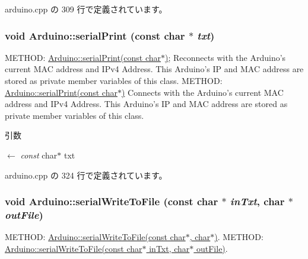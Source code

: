  arduino.cpp の 309 行で定義されています。\hypertarget{classArduino_a69177b866c5c37541d7e860c4e9ae3d7_a69177b866c5c37541d7e860c4e9ae3d7}{
\subsubsection[{serialPrint}]{\setlength{\rightskip}{0pt plus 5cm}void Arduino::serialPrint (const char $\ast$ {\em txt})}}
\label{classArduino_a69177b866c5c37541d7e860c4e9ae3d7_a69177b866c5c37541d7e860c4e9ae3d7}


METHOD: \hyperlink{classArduino_a69177b866c5c37541d7e860c4e9ae3d7_a69177b866c5c37541d7e860c4e9ae3d7}{Arduino::serialPrint(const char$\ast$)}; Reconnects with the Arduino's current MAC address and IPv4 Address. This Arduino's IP and MAC address are stored as private member variables of this class. METHOD: \hyperlink{classArduino_a69177b866c5c37541d7e860c4e9ae3d7_a69177b866c5c37541d7e860c4e9ae3d7}{Arduino::serialPrint(const char$\ast$)} Connects with the Arduino's current MAC address and IPv4 Address. This Arduino's IP and MAC address are stored as private member variables of this class.


\begin{DoxyParams}{引数}
\item[\mbox{$\leftarrow$} {\em const}]char$\ast$ txt \end{DoxyParams}


 arduino.cpp の 324 行で定義されています。\hypertarget{classArduino_a0359a1c739e959b478b8756517adbde9_a0359a1c739e959b478b8756517adbde9}{
\subsubsection[{serialWriteToFile}]{\setlength{\rightskip}{0pt plus 5cm}void Arduino::serialWriteToFile (const char $\ast$ {\em inTxt}, \/  char $\ast$ {\em outFile})}}
\label{classArduino_a0359a1c739e959b478b8756517adbde9_a0359a1c739e959b478b8756517adbde9}


METHOD: \hyperlink{classArduino_a0359a1c739e959b478b8756517adbde9_a0359a1c739e959b478b8756517adbde9}{Arduino::serialWriteToFile(const char$\ast$, char$\ast$)}. METHOD: \hyperlink{classArduino_a0359a1c739e959b478b8756517adbde9_a0359a1c739e959b478b8756517adbde9}{Arduino::serialWriteToFile(const char$\ast$ inTxt, char$\ast$ outFile)}.


